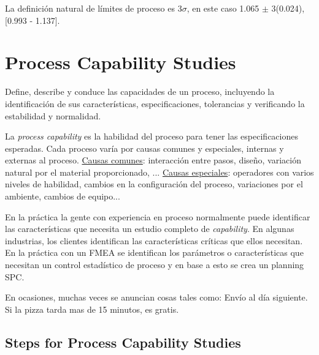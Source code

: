 \documentclass[oneside]{book}
\begin{document}
La definición natural de límites de proceso es 3$\sigma$, en este caso 1.065 $\pm$ 3(0.024), [0.993 - 1.137].

\section{Process Capability Studies}

Define, describe y conduce las capacidades de un proceso, incluyendo la identificación de sus características, especificaciones, tolerancias y verificando la estabilidad y normalidad.

La \textit{process capability} es la habilidad del proceso para tener las especificaciones esperadas. Cada proceso varía por causas comunes y especiales, internas y externas al proceso. \underline{Causas comunes}: interacción entre pasos, diseño, variación natural por el material proporcionado, ... \underline{Causas especiales}: operadores con varios niveles de habilidad, cambios en la configuración del proceso, variaciones por el ambiente, cambios de equipo...

En la práctica la gente con experiencia en proceso normalmente puede identificar las características que necesita un estudio completo de \textit{capability}. En algunas industrias, los clientes identifican las características críticas que ellos necesitan. En la práctica con un FMEA se identifican los parámetros o características que necesitan un control estadístico de proceso y en base a esto se crea un planning SPC. 

En ocasiones, muchas veces se anuncian cosas tales como: Envío al día siguiente. Si la pizza tarda mas de 15 minutos, es gratis. 

\subsection{Steps for Process Capability Studies}
\end{document}
